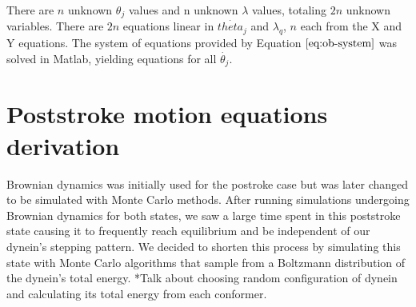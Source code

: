 \documentclass[9pt,twocolumn,twoside]{article}
\begin{document}
  There are $n$ unknown $\theta_j$ values and n unknown $\lambda$ values, totaling $2n$ unknown variables. There are $2n$ equations linear in $\dot{theta_j}$ and $\lambda_q$, $n$ each from the X and Y equations. The system of equations provided by Equation $\ref{eq:ob-system}$ was solved in Matlab, yielding equations for all $\dot{\theta_j}$.

\section*{Poststroke motion equations derivation}
Brownian dynamics was initially used for the postroke case but was later changed to be simulated with Monte Carlo methods. After running simulations undergoing Brownian dynamics for both states, we saw a large time spent in this poststroke state causing it to frequently reach equilibrium and be independent of our dynein's stepping pattern. We decided to shorten this process by simulating this state with Monte Carlo algorithms that sample from a Boltzmann distribution of the dynein's total energy. 
*Talk about choosing random configuration of dynein and calculating its total energy from each conformer. 


\end{document}
